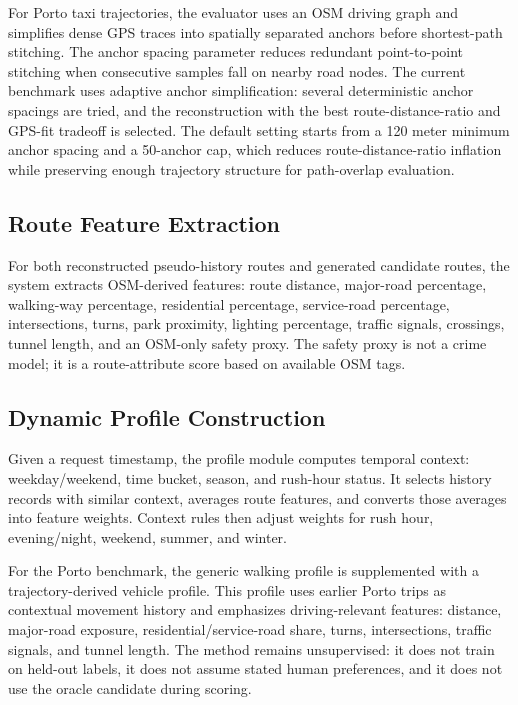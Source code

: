 For Porto taxi trajectories, the evaluator uses an OSM driving graph and simplifies dense GPS traces into spatially separated anchors before shortest-path stitching. The anchor spacing parameter reduces redundant point-to-point stitching when consecutive samples fall on nearby road nodes. The current benchmark uses adaptive anchor simplification: several deterministic anchor spacings are tried, and the reconstruction with the best route-distance-ratio and GPS-fit tradeoff is selected. The default setting starts from a 120 meter minimum anchor spacing and a 50-anchor cap, which reduces route-distance-ratio inflation while preserving enough trajectory structure for path-overlap evaluation.

\subsection{Route Feature Extraction}
For both reconstructed pseudo-history routes and generated candidate routes, the system extracts OSM-derived features: route distance, major-road percentage, walking-way percentage, residential percentage, service-road percentage, intersections, turns, park proximity, lighting percentage, traffic signals, crossings, tunnel length, and an OSM-only safety proxy. The safety proxy is not a crime model; it is a route-attribute score based on available OSM tags.

\subsection{Dynamic Profile Construction}
Given a request timestamp, the profile module computes temporal context: weekday/weekend, time bucket, season, and rush-hour status. It selects history records with similar context, averages route features, and converts those averages into feature weights. Context rules then adjust weights for rush hour, evening/night, weekend, summer, and winter.

For the Porto benchmark, the generic walking profile is supplemented with a trajectory-derived vehicle profile. This profile uses earlier Porto trips as contextual movement history and emphasizes driving-relevant features: distance, major-road exposure, residential/service-road share, turns, intersections, traffic signals, and tunnel length. The method remains unsupervised: it does not train on held-out labels, it does not assume stated human preferences, and it does not use the oracle candidate during scoring.


